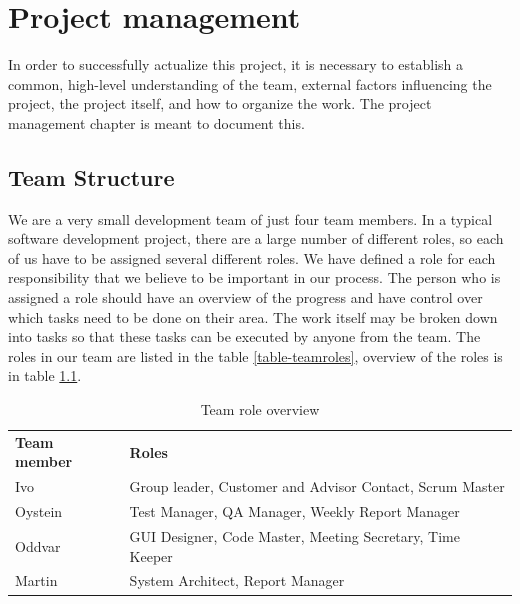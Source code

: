 \chapter{Project management}

\minitoc

In order to successfully actualize this project, it is necessary to establish a common, high-level understanding of the team, external factors influencing the project, the project itself, and how to organize the work. The project management chapter is meant to document this.

\clearpage

\section{Team Structure}
We are a very small development team of just four team members. In a typical software development project, there are a large number of different roles, so each of us have to be assigned several different roles. We have defined a role for each responsibility that we believe to be important in our process. The person who is assigned a role should have an overview of the progress and have control over which tasks need to be done on their area. The work itself may be broken down into tasks so that these tasks can be executed by anyone from the team. The roles in our team are listed in the table \ref{table-teamroles}, overview of the roles is in table \ref{table-rolesoverview}.

\begin{table}
\centering
\begin{tabular}{ l  l }
  \hline
  \textbf{Team member} & \textbf{Roles} \\
  Ivo & Group leader, Customer and Advisor Contact, Scrum Master \\
  Oystein & Test Manager, QA Manager, Weekly Report Manager \\
  Oddvar & GUI Designer, Code Master, Meeting Secretary, Time Keeper \\
  Martin & System Architect, Report Manager \\
  \hline
\end{tabular}
\label{table-rolesoverview}
\caption{Team role overview}
\end{table}


